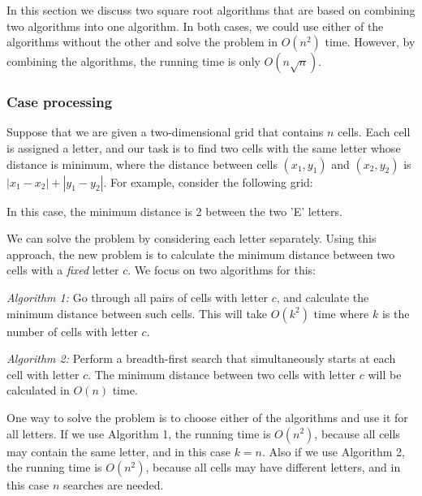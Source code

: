 In this section we discuss two square root algorithms
that are based on combining two algorithms into one algorithm.
In both cases, we could use either of the algorithms
without the other
and solve the problem in $O(n^2)$ time.
However, by combining the algorithms, the running
time is only $O(n \sqrt n)$.

\subsubsection{Case processing}

Suppose that we are given a two-dimensional
grid that contains $n$ cells.
Each cell is assigned a letter,
and our task is to find two cells
with the same letter whose distance is minimum,
where the distance between cells
$(x_1,y_1)$ and $(x_2,y_2)$ is $|x_1-x_2|+|y_1-y_2|$.
For example, consider the following grid:

\begin{center}
\end{center}
In this case, the minimum distance is 2 between the two 'E' letters.

We can solve the problem by considering each letter separately.
Using this approach, the new problem is to calculate
the minimum distance
between two cells with a \emph{fixed} letter $c$.
We focus on two algorithms for this:

\emph{Algorithm 1:} Go through all pairs of cells with letter $c$,
and calculate the minimum distance between such cells.
This will take $O(k^2)$ time where $k$ is the number of cells with letter $c$.

\emph{Algorithm 2:} Perform a breadth-first search that simultaneously
starts at each cell with letter $c$. The minimum distance between
two cells with letter $c$ will be calculated in $O(n)$ time.

One way to solve the problem is to choose either of the
algorithms and use it for all letters.
If we use Algorithm 1, the running time is $O(n^2)$,
because all cells may contain the same letter,
and in this case $k=n$.
Also if we use Algorithm 2, the running time is $O(n^2)$,
because all cells may have different letters,
and in this case $n$ searches are needed.

